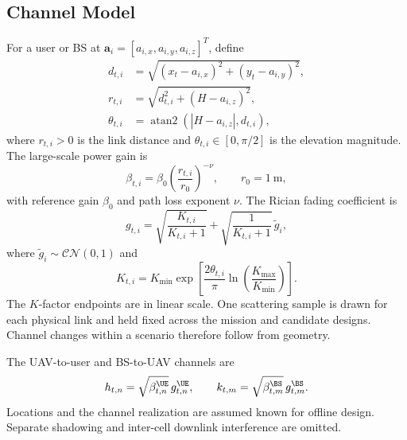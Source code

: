\subsection{Channel Model}
\label{subsec:channel_assumptions}
For a user or BS at $\bm a_i=[a_{i,x},a_{i,y},a_{i,z}]^T$, define
\begin{align}
d_{t,i}&=\sqrt{(x_t-a_{i,x})^2+(y_t-a_{i,y})^2},\nonumber\\
r_{t,i}&=\sqrt{d_{t,i}^2+(H-a_{i,z})^2},\nonumber\\
\theta_{t,i}&=\operatorname{atan2}(|H-a_{i,z}|,d_{t,i}),
\label{eq:distances}
\end{align}
where $r_{t,i}>0$ is the link distance and $\theta_{t,i}\in[0,\pi/2]$ is the elevation magnitude. The large-scale power gain is
\begin{equation}
\beta_{t,i}=\beta_0\left(\frac{r_{t,i}}{r_0}\right)^{-\nu},
\qquad r_0=1\ \mathrm m,
\label{eq:path_loss}
\end{equation}
with reference gain $\beta_0$ and path loss exponent $\nu$. The Rician fading coefficient is
\begin{equation}
g_{t,i}=\sqrt{\frac{K_{t,i}}{K_{t,i}+1}}
+\sqrt{\frac{1}{K_{t,i}+1}}\,\widetilde g_i,
\label{eq:rician_fading}
\end{equation}
where $\widetilde g_i\sim\mathcal{CN}(0,1)$ and
\begin{equation}
K_{t,i}=K_{\min}\exp\!\left[
\frac{2\theta_{t,i}}{\pi}\ln\!\left(\frac{K_{\max}}{K_{\min}}\right)\right].
\label{eq:rician_k}
\end{equation}
The $K$-factor endpoints are in linear scale. One scattering sample is drawn for each physical link and held fixed across the mission and candidate designs. Channel changes within a scenario therefore follow from geometry.

The UAV-to-user and BS-to-UAV channels are
\begin{equation}
h_{t,n}=\sqrt{\beta_{t,n}^{\UE}}\,g_{t,n}^{\UE},\qquad
k_{t,m}=\sqrt{\beta_{t,m}^{\BS}}\,g_{t,m}^{\BS}.
\label{eq:channels}
\end{equation}
Locations and the channel realization are assumed known for offline design. Separate shadowing and inter-cell downlink interference are omitted.

